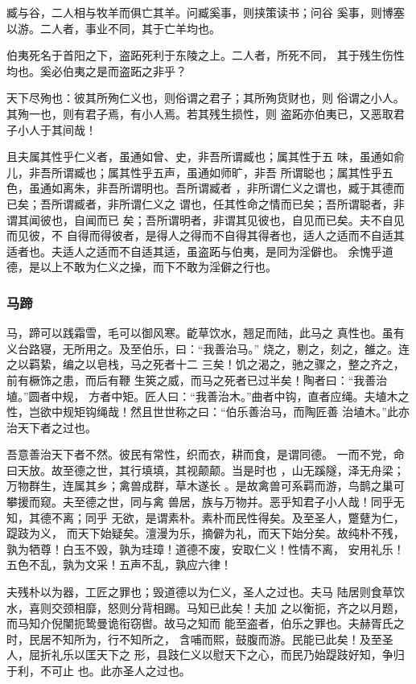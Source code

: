 \documentclass[]{article}
\begin{document}
臧与谷，二人相与牧羊而俱亡其羊。问臧奚事，则挟策读书；问谷
奚事，则博塞以游。二人者，事业不同，其于亡羊均也。

伯夷死名于首阳之下，盗跖死利于东陵之上。二人者，所死不同，
其于残生伤性均也。奚必伯夷之是而盗跖之非乎？

天下尽殉也：彼其所殉仁义也，则俗谓之君子；其所殉货财也，则
俗谓之小人。其殉一也，则有君子焉，有小人焉。若其残生损性，则
盗跖亦伯夷已，又恶取君子小人于其间哉！

且夫属其性乎仁义者，虽通如曾、史，非吾所谓臧也；属其性于五
味，虽通如俞儿，非吾所谓臧也；属其性乎五声，虽通如师旷，非吾
所谓聪也；属其性乎五色，虽通如离朱，非吾所谓明也。吾所谓臧者
，非所谓仁义之谓也，臧于其德而已矣；吾所谓臧者，非所谓仁义之
谓也，任其性命之情而已矣；吾所谓聪者，非谓其闻彼也，自闻而已
矣；吾所谓明者，非谓其见彼也，自见而已矣。夫不自见而见彼，不
自得而得彼者，是得人之得而不自得其得者也，适人之适而不自适其
适者也。夫适人之适而不自适其适，虽盗跖与伯夷，是同为淫僻也。
余愧乎道德，是以上不敢为仁义之操，而下不敢为淫僻之行也。

\hypertarget{header-n695}{%
\subsubsection{马蹄}\label{header-n695}}

马，蹄可以践霜雪，毛可以御风寒。齕草饮水，翘足而陆，此马之
真性也。虽有义台路寝，无所用之。及至伯乐，曰：``我善治马。''
烧之，剔之，刻之，雒之。连之以羁絷，编之以皂栈，马之死者十二
三矣！饥之渴之，驰之骤之，整之齐之，前有橛饰之患，而后有鞭
生筴之威，而马之死者已过半矣！陶者曰：``我善治埴。''圆者中规，
方者中矩。匠人曰：``我善治木。''曲者中钩，直者应绳。夫埴木之
性，岂欲中规矩钩绳哉！然且世世称之曰：``伯乐善治马，而陶匠善
治埴木。''此亦治天下者之过也。

吾意善治天下者不然。彼民有常性，织而衣，耕而食，是谓同德。
一而不党，命曰天放。故至德之世，其行填填，其视颠颠。当是时也
，山无蹊隧，泽无舟梁；万物群生，连属其乡；禽兽成群，草木遂长
。是故禽兽可系羁而游，鸟鹊之巢可攀援而窥。夫至德之世，同与禽
兽居，族与万物并。恶乎知君子小人哉！同乎无知，其德不离；同乎
无欲，是谓素朴。素朴而民性得矣。及至圣人，蹩躠为仁，踶跂为义，
而天下始疑矣。澶漫为乐，摘僻为礼，而天下始分矣。故纯朴不残，
孰为牺尊！白玉不毁，孰为珪璋！道德不废，安取仁义！性情不离，
安用礼乐！五色不乱，孰为文采！五声不乱，孰应六律！

夫残朴以为器，工匠之罪也；毁道德以为仁义，圣人之过也。夫马
陆居则食草饮水，喜则交颈相靡，怒则分背相踢。马知已此矣！夫加
之以衡扼，齐之以月题，而马知介倪闉扼鸷曼诡衔窃辔。故马之知而
能至盗者，伯乐之罪也。夫赫胥氏之时，民居不知所为，行不知所之，
含哺而熙，鼓腹而游。民能已此矣！及至圣人，屈折礼乐以匡天下之
形，县跂仁义以慰天下之心，而民乃始踶跂好知，争归于利，不可止
也。此亦圣人之过也。
\end{document}
